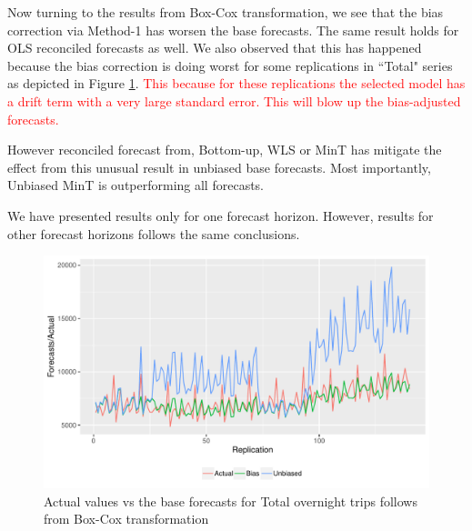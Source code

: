 \documentclass[12pt]{article}
\theoremstyle{definition}
\theoremstyle{property}
\begin{document}
Now turning to the results from Box-Cox transformation, we see that the bias correction via Method-1 has worsen the base forecasts. The same result holds for OLS reconciled forecasts as well. We also observed that this has happened because the bias correction is doing worst for some replications in ``Total" series as depicted in Figure \ref{fig:Total_FcVsTrue_BoxCox}. \textcolor{red}{This because for these replications the selected model has a drift term with a very large standard error. This will blow up the bias-adjusted forecasts.}

However reconciled forecast from, Bottom-up, WLS or MinT has mitigate the effect from this unusual result in unbiased base forecasts. Most importantly, Unbiased MinT is outperforming all forecasts.

We have presented results only for one forecast horizon. However, results for other forecast horizons follows the same conclusions.


\begin{figure}
	\centering
	\small
	\includegraphics[width = \textwidth]{Empirical-results/Final-results/Total_FcVsTrue_BoxCox.pdf}
	\caption{Actual values vs the base forecasts for Total overnight trips follows from Box-Cox transformation}\label{fig:Total_FcVsTrue_BoxCox}
\end{figure}





	
\end{document}
